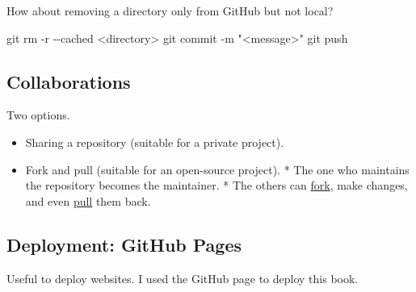 \documentclass[
  letterpaper,
  DIV=11,
  numbers=noendperiod]{scrreprt}
\newenvironment{Shaded}{\begin{snugshade}}{\end{snugshade}}
\newcommand{\AttributeTok}[1]{\textcolor[rgb]{0.40,0.45,0.13}{#1}}
\newcommand{\CommentTok}[1]{\textcolor[rgb]{0.37,0.37,0.37}{#1}}
\newcommand{\ExtensionTok}[1]{\textcolor[rgb]{0.00,0.23,0.31}{#1}}
\newcommand{\FunctionTok}[1]{\textcolor[rgb]{0.28,0.35,0.67}{#1}}
\newcommand{\NormalTok}[1]{\textcolor[rgb]{0.00,0.23,0.31}{#1}}
\newcommand{\OperatorTok}[1]{\textcolor[rgb]{0.37,0.37,0.37}{#1}}
\newcommand{\StringTok}[1]{\textcolor[rgb]{0.13,0.47,0.30}{#1}}
\providecommand{\tightlist}{%
  \setlength{\itemsep}{0pt}\setlength{\parskip}{0pt}}\usepackage{longtable,booktabs,array}
\begin{document}
\begin{Shaded}
\end{Shaded}

How about removing a directory only from GitHub but not local?

\begin{Shaded}
\begin{Highlighting}[]
\FunctionTok{git}\NormalTok{ rm }\AttributeTok{{-}r} \AttributeTok{{-}{-}cached} \OperatorTok{\textless{}}\NormalTok{directory}\OperatorTok{\textgreater{}}
\FunctionTok{git}\NormalTok{ commit }\AttributeTok{{-}m} \StringTok{"\textless{}message\textgreater{}"}
\FunctionTok{git}\NormalTok{ push}
\end{Highlighting}
\end{Shaded}

\hypertarget{collaborations}{%
\subsection*{Collaborations}\label{collaborations}}

Two options.

\begin{itemize}
\tightlist
\item
  Sharing a repository (suitable for a private project).
\item
  Fork and pull (suitable for an open-source project). \hspace{0pt} *
  The one who maintains the repository becomes the maintainer.
  \hspace{0pt} * The others can
  \href{https://help.GitHub.com/articles/about-forks/}{fork}, make
  changes, and even
  \href{https://help.GitHub.com/articles/about-pull-requests/}{pull}
  them back.
\end{itemize}

\hypertarget{deployment-github-pages}{%
\subsection*{Deployment: GitHub Pages}\label{deployment-github-pages}}

Useful to deploy websites. I used the GitHub page to deploy this book.
\end{document}
